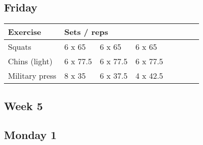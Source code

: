 \documentclass[12pt, a4paper]{article}%
\begin{document}
  \subsection*{\hspace{0.5em} Friday }


  \begin{tabular}{l|lllllll}
  \hspace{0.75em} \textbf{Exercise} & \multicolumn{ 7 }{l}{ \textbf{Sets / reps} } \\ \hline

            \hspace{0.75em} Squats
            & 6 x 65
            & 6 x 65
            & 6 x 65
            & 
            & 
            & 
            & 
            \\


            \hspace{0.75em} Chins (light)
            & 6 x 77.5
            & 6 x 77.5
            & 6 x 77.5
            & 
            & 
            & 
            & 
            \\


            \hspace{0.75em} Military press
            & 8 x 35
            & 6 x 37.5
            & 4 x 42.5
            & 
            & 
            & 
            & 
            \\


  \end{tabular}


\clearpage \subsection*{\hspace{0.25em} Week 5 }
  \subsection*{\hspace{0.5em} Monday 1 }
\end{document}
